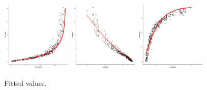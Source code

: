 \documentclass[11pt,letterpaper]{article}
\newif \ifcomment
\newcommand\rljf[1]{\ifcomment{{\color{blue}(#1)}}\else{}\fi}
\begin{document}
%
%
%
%
%
%
%

\begin{figure}
\includegraphics[width=0.3\textwidth]{code/figures/english-info-fitted.pdf}
\includegraphics[width=0.3\textwidth]{code/figures/english-logbeta-mem-fitted.pdf}
	\includegraphics[width=0.3\textwidth]{code/figures/english-nlogbeta-ee-fitted.pdf}
	\caption{Fitted values. \rljf{Definitely need a better label, also axis labels are too small to read}}\label{fig:eng-pos-fitted}
\end{figure}
\end{document}
